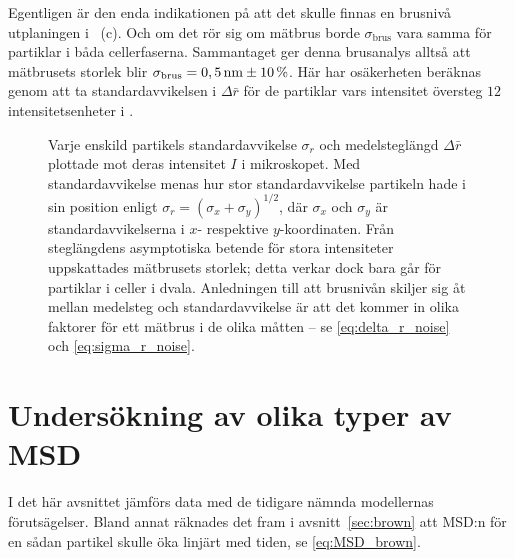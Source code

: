 Egentligen är den enda indikationen på att det skulle finnas en brusnivå utplaningen\footnotemark{} i ~(c). Och om det rör sig om mätbrus borde $\sigma_\text{brus}$ vara samma för partiklar i båda cellerfaserna. Sammantaget ger denna brusanalys alltså att mätbrusets storlek blir $\sigma_\text{brus}=\unit[0,5]{nm} \pm 10\,\%$. Här har osäkerheten beräknas genom att ta standardavvikelsen i $\Delta\bar{r}$ för de partiklar vars intensitet översteg $12$\,intensitetsenheter i .



\begin{figure}\centering
   \subfigure[][]{}
   \subfigure[][]{}
   \subfigure[][]{}
   \subfigure[][]{}
\caption{Varje enskild partikels standardavvikelse $\sigma_r$ och medelsteglängd $\Delta{\bar{r}}$ plottade mot deras intensitet $I$ i mikroskopet. 
Med standardavvikelse menas hur stor standardavvikelse partikeln hade i sin position enligt $\sigma_r=(\sigma_x+\sigma_y)^{1/2}$, där $\sigma_x$ och $\sigma_y$ är standardavvikelserna i $x$- respektive $y$-koordinaten.
Från steglängdens asymptotiska betende för stora intensiteter uppskattades mätbrusets storlek; detta verkar dock bara går för partiklar i celler i dvala. 
Anledningen till att brusnivån skiljer sig åt mellan medelsteg och standardavvikelse är att det kommer in olika faktorer för ett mätbrus i de olika måtten -- se \eqref{eq:delta_r_noise} och \eqref{eq:sigma_r_noise}. }
\label{fig:storleksberoende}
\end{figure}



\section{Undersökning av olika typer av MSD}

I det här avsnittet jämförs data med de tidigare nämnda modellernas förutsägelser. Bland annat räknades det fram i avsnitt~\ref{sec:brown} att MSD:n för en sådan partikel skulle öka linjärt med tiden, se \eqref{eq:MSD_brown}.

